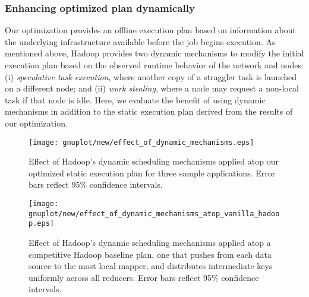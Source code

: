 \subsubsection{Enhancing optimized plan dynamically} 

Our optimization provides an offline execution plan based on information about
the underlying infrastructure available before the job begins execution.
As mentioned above, Hadoop provides two dynamic mechanisms to modify the
initial execution plan based on the observed runtime behavior of the network and
nodes:  (i) {\em speculative task execution}, where another copy of a straggler
task is launched on a different node; and (ii) {\em work stealing}, where a
node may request a non-local task if that node is idle.
Here, we evaluate the benefit of using dynamic mechanisms in addition to the
static execution plan derived from the results of our optimization.

\begin{figure}[htbp]
  \centering
  \texttt{[image: gnuplot/new/effect\_of\_dynamic\_mechanisms.eps]}
  \caption{Effect of Hadoop's dynamic scheduling mechanisms applied atop our
  optimized static execution plan for three sample applications.
  Error bars reflect 95\% confidence intervals.
  \label{fig:effect_of_dynamic_mechanisms}}
\end{figure}

\begin{figure}[htbp]
  \centering
  \texttt{[image: gnuplot/new/effect\_of\_dynamic\_mechanisms\_atop\_vanilla\_hadoop.eps]}
  \caption{Effect of Hadoop's dynamic scheduling mechanisms applied atop a
  competitive Hadoop baseline plan, one that pushes from each data source to
  the most local mapper, and distributes intermediate keys uniformly across all
  reducers.
  Error bars reflect 95\% confidence intervals.
  \label{fig:effect_of_dynamic_mechanisms_atop_vanilla_hadoop}}
\end{figure}

